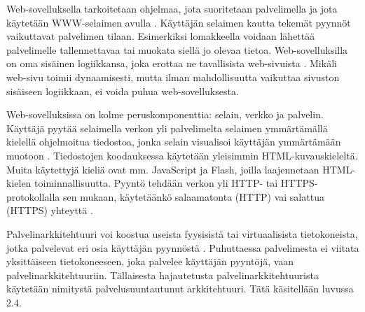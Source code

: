 Web-sovelluksella tarkoitetaan ohjelmaa, jota suoritetaan palvelimella ja jota käytetään WWW-selaimen avulla \cite{uml}. Käyttäjän selaimen kautta tekemät pyynnöt vaikuttavat palvelimen tilaan. Esimerkiksi lomakkeella voidaan lähettää palvelimelle tallennettavaa tai muokata siellä jo olevaa tietoa. Web-sovelluksilla on oma sisäinen logiikkansa, joka erottaa ne tavallisista web-sivuista \cite{uml}. Mikäli web-sivu toimii dynaamisesti, mutta ilman mahdollisuutta vaikuttaa sivuston sisäiseen logiikkaan, ei voida puhua web-sovelluksesta.

Web-sovelluksissa on kolme peruskomponenttia: selain, verkko ja palvelin. Käyttäjä pyytää selaimella verkon yli palvelimelta selaimen ymmärtämällä kielellä ohjelmoitua tiedostoa, jonka selain visualisoi käyttäjän ymmärtämään muotoon \cite{uml}. Tiedostojen koodauksessa käytetään yleisimmin HTML-kuvauskieleltä. Muita käytettyjä kieliä ovat mm. JavaScript ja Flash, joilla laajennetaan HTML-kielen toiminnallisuutta. Pyyntö tehdään verkon yli HTTP- tai HTTPS-protokollalla sen mukaan, käytetäänkö salaamatonta (HTTP) vai salattua (HTTPS) yhteyttä \cite{rfc2818}.

Palvelinarkkitehtuuri voi koostua useista fyysisistä tai virtuaalisista tietokoneista, jotka palvelevat eri osia käyttäjän pyynnöstä \cite{soa}. Puhuttaessa palvelimesta ei viitata yksittäiseen tietokoneeseen, joka palvelee käyttäjän pyyntöjä, vaan palvelinarkkitehtuuriin. Tällaisesta hajautetusta palvelinarkkitehtuurista käytetään nimitystä palvelusuuntautunut arkkitehtuuri. Tätä käsitellään luvussa 2.4.